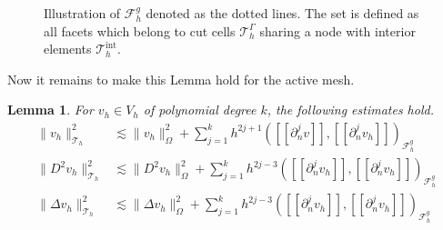 \documentclass[11pt]{article}
\newtheorem{lemma}[theorem]{Lemma}
\theoremstyle{remark}
\newcommand{\jump}[1]{\left[\!\left[ #1 \right]\!\right]}
\numberwithin{equation}{section}
\begin{document}
\begin{figure}

\caption{Illustration of $\mathcal{F} _{h}^{g}$ denoted as the dotted lines. The set is defined as all facets which belong to cut cells $\mathcal{T} ^{\Gamma }_{h}$ sharing a node with interior elements $\mathcal{T} ^{\mathrm{int}  }_{h}$.  }
\label{fig:illustration_F_g}
\end{figure}


Now it remains to make this Lemma hold for the active mesh.


\begin{lemma}
    \label{lemma:bi_inv_gh_lemma}
    For $v_{h} \in  V_{h}$ of polynomial degree $k$, the following estimates hold.
        \begin{subequations}
            \begin{align}
                \label{eq:bi_inv_gh_1}
                \| v_h \|_{ \mathcal{T} _{h} }^{ 2 }  & \lesssim  \| v_h \|_{ \Omega  }^{ 2 }  + \sum_{j=1}^{k} h^{2j+1} ( \jump{ \partial ^{j}_{n} v }, \jump{ \partial ^{j}_{n} v_h}    )_{\mathcal{F}_{h}^{g}}\\
                \label{eq:bi_inv_gh_2}
                \| D ^2 v_h \|_{ \mathcal{T} _{h} }^{ 2 }  & \lesssim  \| D^2 v_h \|_{ \Omega  }^{ 2 }  + \sum_{j=1}^{k} h^{2j-3} ( \jump{ \partial ^{j}_{n} v_h }, \jump{ \partial ^{j}_{n}v_h }    )_{\mathcal{F}_{h}^{g}} \\
                \label{eq:bi_inv_gh_3}
                \| \Delta v_h \|_{ \mathcal{T} _{h} }^{ 2 }  & \lesssim  \| \Delta v_h \|_{ \Omega  }^{ 2 }  + \sum_{j=1}^{k} h^{2j-3} ( \jump{ \partial ^{j}_{n} v_h }, \jump{ \partial ^{j}_{n}v_h }    )_{\mathcal{F}_{h}^{g}}
            \end{align}
        \end{subequations}
\end{lemma}
\end{document}
